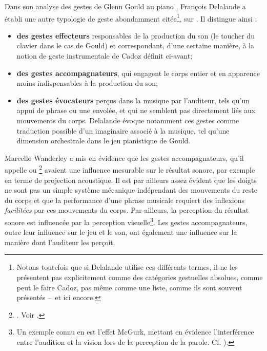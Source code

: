 \noindent Dans son analyse des gestes de Glenn Gould au piano \cite{delalande_geste_1988}, François Delalande a établi une autre typologie de geste abondamment citée\footnote{Notons toutefois que si Delalande utilise ces différents termes, il ne les présentent pas explicitement comme des catégories gestuelles absolues, comme peut le faire Cadoz, pas même comme une liste, comme ils sont souvent présentés --~et ici encore.}, sur . Il distingue ainsi :
\vspace{-1em}
\begin{itemize}[noitemsep]
	\item \textbf{des gestes effecteurs} responsables de la production du son (le toucher du clavier dans le cas de Gould) et correspondant, d'une certaine manière, à la notion de geste instrumentale de Cadoz définit ci-avant;
	\item \textbf{des gestes accompagnateurs}, qui engagent le corps entier et en apparence moins indispensables à la production du son;
	\item \textbf{des gestes évocateurs} perçus dans la musique par l'auditeur, tels qu'un appui de phrase ou une envolée, et qui ne semblent pas directement liés aux mouvements du corps. Delalande évoque notamment ces gestes comme traduction possible d'un imaginaire associé à la musique, tel qu'une dimension orchestrale dans le jeu pianistique de Gould.
\end{itemize}
\noindent Marcello Wanderley a mis en évidence que les gestes accompagnateurs, qu'il appelle  ou \footnote{. Voir \cite{wanderley_non-obvious_1999}.} avaient une influence mesurable sur le résultat sonore, par exemple en terme de projection acoustique. Il est par ailleurs assez évident que les doigts ne sont pas un simple système mécanique indépendant des mouvements du reste du corps et que la performance d'une phrase musicale requiert des inflexions \textit{facilitées} par ces mouvements du corps. Par ailleurs, la perception du résultat sonore est influencée par la perception visuelle\footnote{Un exemple connu en est l'effet McGurk, mettant en évidence l'interférence entre l'audition et la vision lors de la perception de la parole. Cf. \cite{macdonald_visual_1978}).}. Les gestes accompagnateurs, outre leur influence sur le jeu et le son, ont également une influence sur la manière dont l'auditeur les perçoit. 

